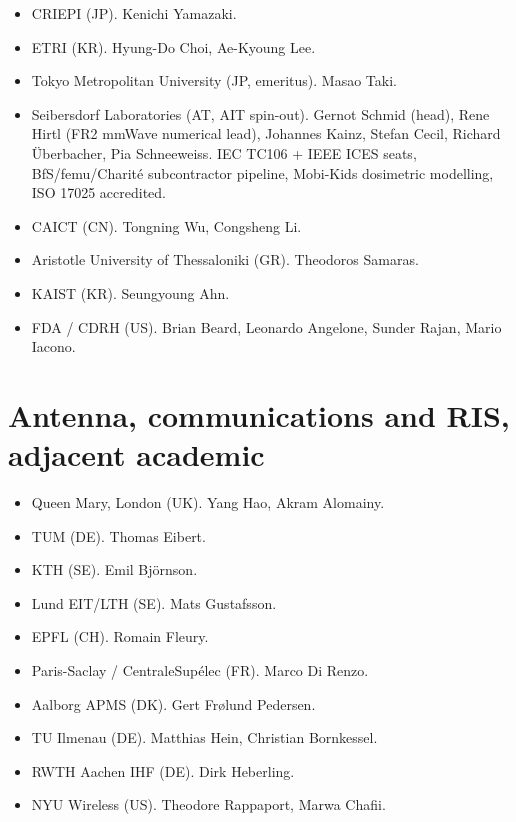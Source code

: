 \documentclass[10pt,a4paper]{article}
\begin{document}
\begin{itemize}
  \item CRIEPI (JP). Kenichi Yamazaki.
  \item ETRI (KR). Hyung-Do Choi, Ae-Kyoung Lee.
  \item Tokyo Metropolitan University (JP, emeritus). Masao Taki.
  \item Seibersdorf Laboratories (AT, AIT spin-out). Gernot Schmid (head), Rene Hirtl (FR2 mmWave numerical lead), Johannes Kainz, Stefan Cecil, Richard \"Uberbacher, Pia Schneeweiss. IEC TC106 + IEEE ICES seats, BfS/femu/Charit\'e subcontractor pipeline, Mobi-Kids dosimetric modelling, ISO 17025 accredited.
  \item CAICT (CN). Tongning Wu, Congsheng Li.
  \item Aristotle University of Thessaloniki (GR). Theodoros Samaras.
  \item KAIST (KR). Seungyoung Ahn.
  \item FDA / CDRH (US). Brian Beard, Leonardo Angelone, Sunder Rajan, Mario Iacono.
\end{itemize}

\section{Antenna, communications and RIS, adjacent academic}
\begin{itemize}
  \item Queen Mary, London (UK). Yang Hao, Akram Alomainy.
  \item TUM (DE). Thomas Eibert.
  \item KTH (SE). Emil Bj\"ornson.
  \item Lund EIT/LTH (SE). Mats Gustafsson.
  \item EPFL (CH). Romain Fleury.
  \item Paris-Saclay / CentraleSup\'elec (FR). Marco Di Renzo.
  \item Aalborg APMS (DK). Gert Fr\o lund Pedersen.
  \item TU Ilmenau (DE). Matthias Hein, Christian Bornkessel.
  \item RWTH Aachen IHF (DE). Dirk Heberling.
  \item NYU Wireless (US). Theodore Rappaport, Marwa Chafii.
\end{itemize}
\end{document}
